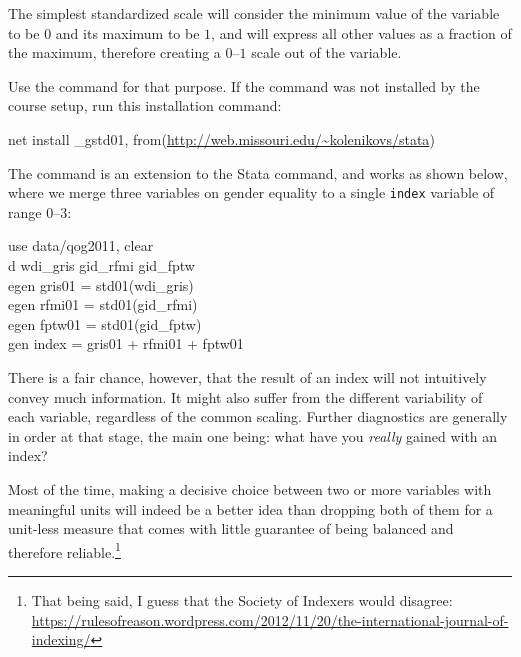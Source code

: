 The simplest standardized scale will consider the minimum value of the variable to be $0$ and its maximum to be $1$, and will express all other values as a fraction of the maximum, therefore creating a $0$--$1$ scale out of the variable.

\label{sec:gtsd01}%
Use the  command for that purpose. If the command was not installed by the course setup, run this installation command:%
	
  \begin{fullwidth}
	  \begin{docspec}
		  net install \_gstd01,%
			  from(\url{http://web.missouri.edu/~kolenikovs/stata})
	  \end{docspec}  
  \end{fullwidth}
	
The command is an extension to the Stata  command, and works as shown below, where we merge three \QOG variables on gender equality to a single \texttt{index} variable of range $0$--$3$:%

\begin{docspec}
	use data/qog2011, clear\\
	d wdi\_gris gid\_rfmi gid\_fptw\\
	egen gris01 = std01(wdi\_gris)\\
	egen rfmi01 = std01(gid\_rfmi)\\
	egen fptw01 = std01(gid\_fptw)\\
	gen index = gris01 + rfmi01 + fptw01
\end{docspec}

There is a fair chance, however, that the result of an index will not intuitively convey much information. It might also suffer from the different variability of each variable, regardless of the common scaling. Further diagnostics are generally in order at that stage, the main one being: what have you \emph{really} gained with an index?

Most of the time, making a decisive choice between two or more variables with meaningful units will indeed be a better idea than dropping both of them for a unit-less measure that comes with little guarantee of being balanced and therefore reliable.\footnote{That being said, I guess that the Society of Indexers would disagree: \url{https://rulesofreason.wordpress.com/2012/11/20/the-international-journal-of-indexing/}}